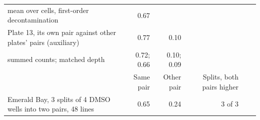 \begin{table}[!htbp]
{\begin{minipage}{183mm}
\begin{tabular}{@{}>{\raggedright\arraybackslash}p{58mm}rrrrrr@{}}
\quad mean over cells, first-order decontamination & 0.67 & & & & & \\
Plate 13, its own pair against other plates' pairs (auxiliary) & 0.77 & 0.10 & & & & \\
\quad summed counts; matched depth & 0.72; 0.66 & 0.10; 0.09 & & & & \\
\midrule
 & Same pair & Other pair & & Splits, both pairs higher & & \\
\midrule
Emerald Bay, 3 splits of 4 DMSO wells into two pairs, 48 lines & 0.65 & 0.24 & & 3 of 3 & & \\
\bottomrule\end{tabular}
\end{minipage}}
\makebox[\textwidth][c]{\usebox{\tbox}}
\end{table}

